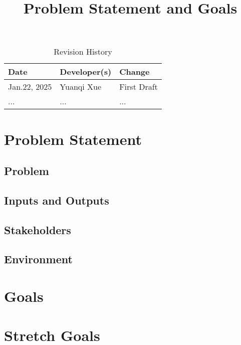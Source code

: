 \documentclass{article}
\title{Problem Statement and Goals\\\progname}
\author{\authname}
\date{}
\begin{document}
\maketitle

\begin{table}[hp]
\caption{Revision History} \label{TblRevisionHistory}
\begin{tabularx}{\textwidth}{llX}
\toprule
\textbf{Date} & \textbf{Developer(s)} & \textbf{Change}\\
\midrule
Jan.22, 2025 & Yuanqi Xue & First Draft\\
... & ... & ...\\
\bottomrule
\end{tabularx}
\end{table}

\section{Problem Statement}


\subsection{Problem}

\subsection{Inputs and Outputs}


\subsection{Stakeholders}

\subsection{Environment}


\section{Goals}

\section{Stretch Goals}
\end{document}
